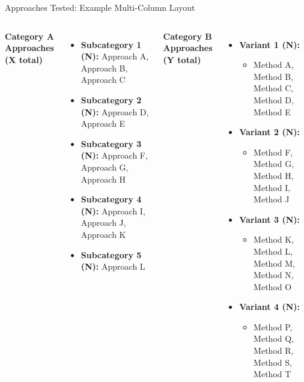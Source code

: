 \documentclass[
    10pt,
    aspectratio=169,
]{beamer}
\begin{document}
\begin{frame}{Approaches Tested: Example Multi-Column Layout}
\small
\begin{columns}[t]
\textbf{Category A Approaches (X total)}
\begin{itemize}
  \item \textbf{Subcategory 1 (N):} Approach A, Approach B, Approach C
  \item \textbf{Subcategory 2 (N):} Approach D, Approach E
  \item \textbf{Subcategory 3 (N):} Approach F, Approach G, Approach H
  \item \textbf{Subcategory 4 (N):} Approach I, Approach J, Approach K
  \item \textbf{Subcategory 5 (N):} Approach L
\end{itemize}

\textbf{Category B Approaches (Y total)}
\begin{itemize}
  \item \textbf{Variant 1 (N):}
  \begin{itemize}
    \scriptsize
    \item Method A, Method B, Method C, Method D, Method E
  \end{itemize}
  \item \textbf{Variant 2 (N):}
  \begin{itemize}
    \scriptsize
    \item Method F, Method G, Method H, Method I, Method J
  \end{itemize}
  \item \textbf{Variant 3 (N):}
  \begin{itemize}
    \scriptsize
    \item Method K, Method L, Method M, Method N, Method O
  \end{itemize}
  \item \textbf{Variant 4 (N):}
  \begin{itemize}
    \scriptsize
    \item Method P, Method Q, Method R, Method S, Method T
  \end{itemize}
\end{itemize}
\end{columns}
\end{frame}

\end{document}
